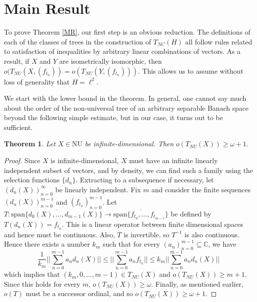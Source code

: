\documentclass{article}
\newtheorem{theorem}{Theorem}
\newcommand{\spn}{\text{span}}
\newcommand{\C}{\mathbb C}
\begin{document}
\section{Main Result}

To prove Theorem \ref{MR}, our first step is an obvious reduction. The definitions of each of the classes of trees in the construction of $T_{NC}(H)$ all follow rules related to satisfaction of inequalities by arbitrary linear combinations of vectors. As a result, if $X$ and $Y$ are isometrically isomorphic, then $o(T_{NU}(X,(f_{t_n})) = o(T_{NU}(Y,(f_{t_n})))$. This allows us to assume without loss of generality that $H = \ell^2$. 

We start with the lower bound in the theorem. In general, one cannot say much about the order of the non-universal tree of an arbitrary separable Banach space beyond the following simple estimate, but in our case, it turns out to be sufficient.

\begin{theorem}
Let $X\in \text{NU}$ be infinite-dimensional. Then $o(T_{NU}(X))\geq\omega + 1$.
\end{theorem}

\begin{proof}
Since $X$ is infinite-dimensional, $X$ must have an infinite linearly independent subset of vectors, and by density, we can find such a family using the selection functions $\{d_n\}$. Extracting to a subsequence if necessary, let $(d_n(X))_{n=0}^\infty$ be linearly independent. Fix $m$ and consider the finite sequences $(d_n(X))_{n=0}^{m-1}$ and $(f_{t_n})_{n=0}^{m-1}$. Let $T : \overline{\spn\{d_0(X),\ldots, d_{m-1}(X)\}}\rightarrow \overline{\spn\{f_{t_0},\ldots, f_{t_{m-1}}\}}$ be defined by $T(d_n(X)) = f_{t_n}$. This is a linear operator between finite dimensional spaces and hence must be continuous. Also, $T$ is invertible, so $T^{-1}$ is also continuous. Hence there exists a number $k_m$ such that for every $(a_n)_{n=0}^{m-1}\subseteq \C$, we have
\begin{equation*}
\frac{1}{k_m}\bigg|\bigg|\sum_{n=0}^{m-1} a_n d_n(X)\bigg|\bigg|\leq \bigg|\bigg|\sum_{n=0}^{m-1} a_n f_{t_n}\bigg|\bigg|\leq k_m\bigg|\bigg|\sum_{n=0}^{m-1} a_n d_n(X)\bigg|\bigg|
\end{equation*}
which implies that $(k_m, 0, \ldots, m-1)\in T_{NU}(X)$ and $o(T_{NU}(X))\geq m+1$. Since this holds for every $m$, $o(T_{NU}(X))\geq\omega$. Finally, as mentioned earlier, $o(T)$ must be a successor ordinal, and so $o(T_{NU}(X))\geq\omega + 1$.
\end{proof}
\end{document}
